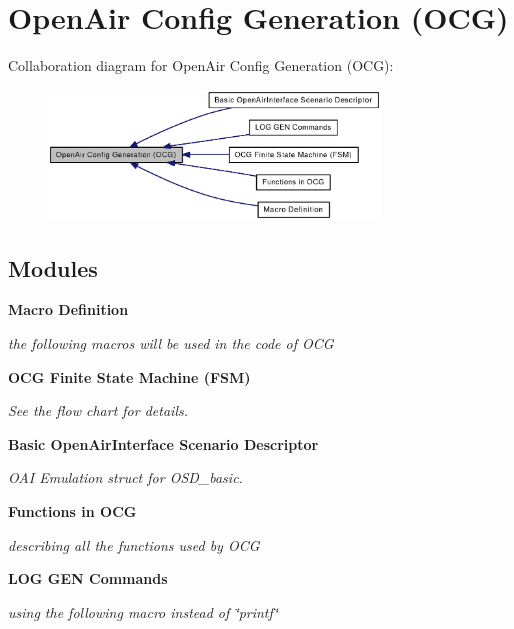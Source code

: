 \section{OpenAir Config Generation (OCG)}
\label{group____OCG}


Collaboration diagram for OpenAir Config Generation (OCG):\nopagebreak
\begin{figure}[H]
\begin{center}
\leavevmode
\includegraphics[width=250pt]{group____OCG}
\end{center}
\end{figure}
\subsection*{Modules}
\begin{CompactItemize}
\item 
{\bf Macro Definition}
\begin{CompactList}\small\item\em the following macros will be used in the code of OCG \item\end{CompactList}

\item 
{\bf OCG Finite State Machine (FSM)}
\begin{CompactList}\small\item\em See the flow chart for details. \item\end{CompactList}

\item 
{\bf Basic OpenAirInterface Scenario Descriptor}
\begin{CompactList}\small\item\em OAI Emulation struct for OSD\_\-basic. \item\end{CompactList}

\item 
{\bf Functions in OCG}
\begin{CompactList}\small\item\em describing all the functions used by OCG \item\end{CompactList}

\item 
{\bf LOG GEN Commands}
\begin{CompactList}\small\item\em using the following macro instead of \char`\"{}printf\char`\"{} \item\end{CompactList}

\end{CompactItemize}
